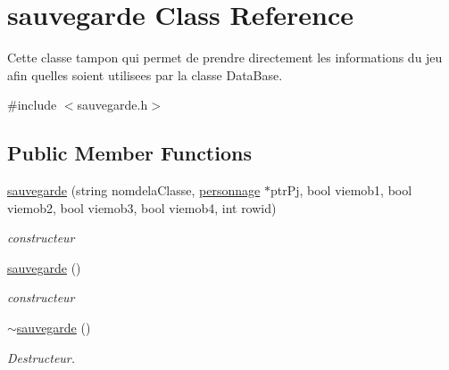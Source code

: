 \hypertarget{classsauvegarde}{}\section{sauvegarde Class Reference}
\label{classsauvegarde}


Cette classe tampon qui permet de prendre directement les informations du jeu afin qu\textquotesingle{}elles soient utilisees par la classe Data\+Base.  




{\ttfamily \#include $<$sauvegarde.\+h$>$}

\subsection*{Public Member Functions}
\begin{DoxyCompactItemize}
\item 
\mbox{\hyperlink{classsauvegarde_a2e3a965ae68f9de4531cdac8f49c8efc}{sauvegarde}} (string nomdela\+Classe, \mbox{\hyperlink{classpersonnage}{personnage}} $\ast$ptr\+Pj, bool viemob1, bool viemob2, bool viemob3, bool viemob4, int rowid)
\begin{DoxyCompactList}\small\item\em constructeur \end{DoxyCompactList}\item 
\mbox{\hyperlink{classsauvegarde_a33f97d222d0c31bb2c9bbdede25ed90a}{sauvegarde}} ()
\begin{DoxyCompactList}\small\item\em constructeur \end{DoxyCompactList}\item 
\mbox{\hyperlink{classsauvegarde_a4a83cdaed16faa198b7b8b16a9d16a01}{$\sim$sauvegarde}} ()
\begin{DoxyCompactList}\small\item\em Destructeur. \end{DoxyCompactList}\end{DoxyCompactItemize}
